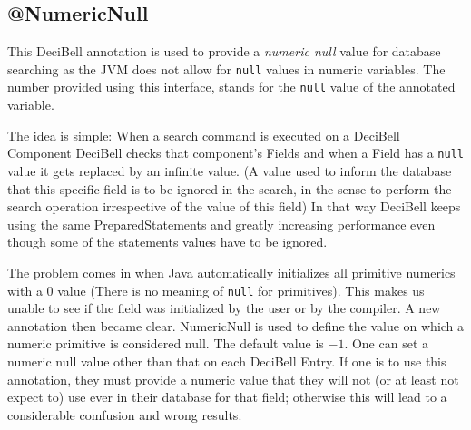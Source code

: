 \documentclass[a4paper,10pt]{article}
\begin{document}
\subsection*{@NumericNull}\label{numericnull}
This DeciBell annotation is used to provide a \emph{numeric null} value for database
searching as the JVM does not allow for \texttt{null} values in numeric variables. The number
provided using this interface, stands for the \texttt{null} value of the annotated variable.

The idea is simple: When a search command is executed on a DeciBell
Component DeciBell checks that component's Fields and when a Field has a \texttt{null}
value it gets replaced by an infinite value. (A value used to inform the database
that this specific field is to be ignored in the search, in the sense to perform
the search operation irrespective of the value of this field)
In that way DeciBell keeps using the same PreparedStatements and
greatly increasing performance even though some of the statements values have
to be ignored.

The problem comes in when Java automatically initializes all primitive numerics
with a $0$ value (There is no meaning of \texttt{null} for primitives).
This makes us unable to see if the field was initialized by
the user or by the compiler. A new annotation then became clear.
NumericNull is used to define the value on which a numeric primitive is
considered null. The default value is $-1$. One can set a numeric null value
other than that on each DeciBell Entry. If one is to use this annotation, they must provide
a numeric value that they will not (or at least not expect to) use ever in their
database for that field; otherwise this will lead to a considerable comfusion and
wrong results.
\end{document}
